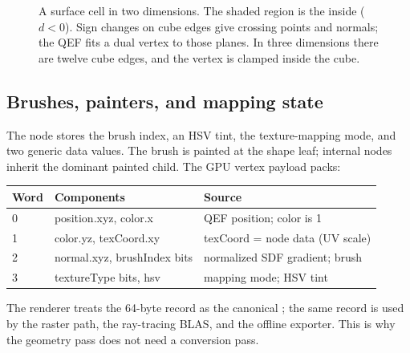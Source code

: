 \begin{figure}[htbp]
\centering
{}
\caption{A surface cell in two dimensions.  The shaded region is the
inside ($d<0$).  Sign changes on cube edges give crossing points and
normals; the QEF fits a dual vertex to those planes.  In three dimensions
there are twelve cube edges, and the vertex is clamped inside the cube.}
\label{fig:qef2d}
\end{figure}

\subsection{Brushes, painters, and mapping state}

The node stores the brush index, an HSV tint, the texture-mapping mode, and
two generic data values.  The brush is painted at the shape leaf; internal
nodes inherit the dominant painted child.  The GPU vertex payload packs:
\begin{center}
\begin{tabular}{@{}lll@{}}
\toprule
Word & Components & Source\\
\midrule
0 & position.xyz, color.x & QEF position; color is 1\\
1 & color.yz, texCoord.xy & texCoord = node data (UV scale)\\
2 & normal.xyz, brushIndex bits & normalized SDF gradient; brush\\
3 & textureType bits, hsv & mapping mode; HSV tint\\
\bottomrule
\end{tabular}
\end{center}
The renderer treats the 64-byte record as the canonical ; the
same record is used by the raster path, the ray-tracing BLAS, and the
offline exporter.  This is why the geometry pass does not need a
conversion pass.
